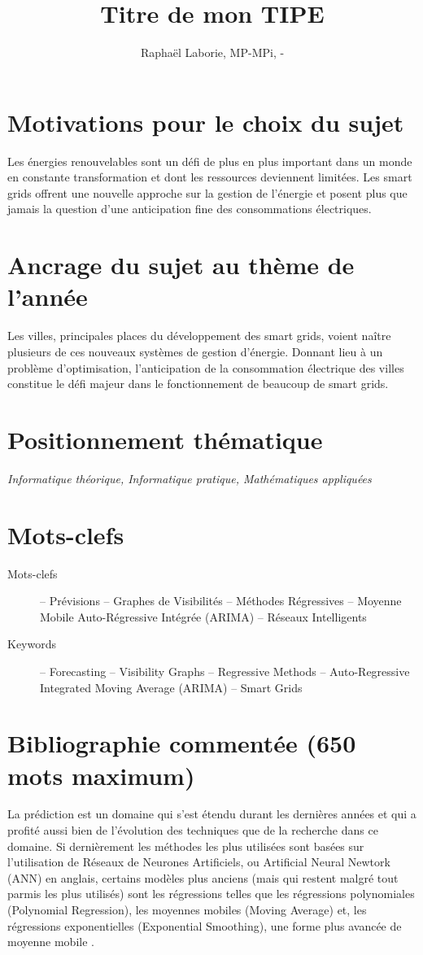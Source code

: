 \documentclass[12pt,a4paper]{article}
\title{Titre de mon TIPE}
\author{Raphaël Laborie, MP\oldstylenums{1}-MPi, \oldstylenums{\the\year}-\oldstylenums{\arabic{nextyear}} }
\newcommand{\positionnementThematique}[1]{
\section*{Positionnement thématique}
{\it #1}}
\newcommand{\motclefs}[2]{
    \section*{Mots-clefs}
        \begin{description}
            \item[Mots-clefs] -- #1 
            \item[Keywords]   -- #2
        \end{description}
}
\begin{document}
\maketitle
\section*{Motivations pour le choix du sujet}
Les énergies renouvelables sont un défi de plus en plus important dans un monde en constante transformation et dont les ressources deviennent limitées.
Les smart grids offrent une nouvelle approche sur la gestion de l'énergie et posent plus que jamais la question d'une anticipation fine des consommations électriques.
\section*{Ancrage du sujet au thème de l'année}
Les villes, principales places du développement des smart grids, voient naître plusieurs de ces nouveaux systèmes de gestion d'énergie. Donnant lieu à un problème d'optimisation, l'anticipation de la consommation électrique des villes constitue le défi majeur dans le fonctionnement de beaucoup de smart grids.
\positionnementThematique{Informatique théorique, Informatique pratique, Mathématiques appliquées}
\motclefs{Prévisions -- Graphes de Visibilités -- Méthodes Régressives -- Moyenne Mobile Auto-Régressive Intégrée (ARIMA) -- Réseaux Intelligents}{Forecasting -- Visibility Graphs -- Regressive Methods -- Auto-Regressive Integrated Moving Average (ARIMA) -- Smart Grids}
\section*{Bibliographie commentée (650 mots maximum)}

La prédiction est un domaine qui s'est étendu durant les dernières années et qui a profité aussi bien de l'évolution des techniques que de la recherche dans ce domaine. Si dernièrement les méthodes les plus utilisées sont basées sur l'utilisation de Réseaux de Neurones Artificiels, ou Artificial Neural Newtork (ANN) en anglais, certains modèles plus anciens (mais qui restent malgré tout parmis les plus utilisés) sont les régressions telles que les régressions polynomiales \cite{polyregrEva} (Polynomial Regression), les moyennes mobiles (Moving Average) et, les régressions exponentielles (Exponential Smoothing), une forme plus avancée de moyenne mobile \cite{exporeview}.
\end{document}
